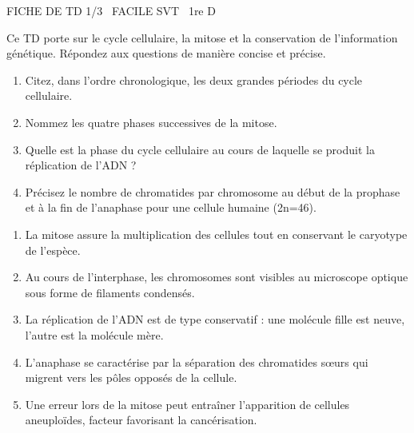 \documentclass[11pt]{article}
\begin{document}
\begin{tcolorbox}[enhanced,colback=popink,colframe=popink,arc=10pt,boxrule=0pt,left=12pt,right=12pt,top=9pt,bottom=9pt]
{\color{white}\popxbold\small FICHE DE TD 1/3 \textbullet\ FACILE \hfill SVT \textbullet\ 1re D\par}
\end{tcolorbox}
\vspace{4pt}
Ce TD porte sur le cycle cellulaire, la mitose et la conservation de l'information génétique. Répondez aux questions de manière concise et précise.

\begin{exercice}
\begin{enumerate}
    \item Citez, dans l'ordre chronologique, les deux grandes périodes du cycle cellulaire.
    \item Nommez les quatre phases successives de la mitose.
    \item Quelle est la phase du cycle cellulaire au cours de laquelle se produit la réplication de l'ADN ?
    \item Précisez le nombre de chromatides par chromosome au début de la prophase et à la fin de l'anaphase pour une cellule humaine (2n=46).
\end{enumerate}
\end{exercice}

\begin{exercice}
\begin{enumerate}
    \item La mitose assure la multiplication des cellules tout en conservant le caryotype de l'espèce.
    \item Au cours de l'interphase, les chromosomes sont visibles au microscope optique sous forme de filaments condensés.
    \item La réplication de l'ADN est de type conservatif : une molécule fille est neuve, l'autre est la molécule mère.
    \item L'anaphase se caractérise par la séparation des chromatides sœurs qui migrent vers les pôles opposés de la cellule.
    \item Une erreur lors de la mitose peut entraîner l'apparition de cellules aneuploïdes, facteur favorisant la cancérisation.
\end{enumerate}
\end{exercice}
\end{document}
